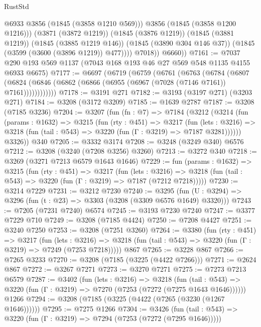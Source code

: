 \begin{lexlean}{RustStd}
\begin{coremodule}
                    @6933
                    @3856
                    (@1845 (@3858 @1210 @569)))
                  @3856
                  (@1845 (@3858 @1200 @1216)))
                (@3871 (@3872 @1219))
                (@1845 (@3876 @1219))
                (@1845 (@3881 @1219))
                (@1845 (@3885 @1219 @146))
                (@1845 (@3890 @304 @146 @37))
                (@1845 (@3599 (@3600 (@3896 @1219)) @477))))
            @7018))
        @6660))
@7161 := @7037 @290 @193 @569 @1137 (@7043 @168 @193 @46 @27 @569 @548 @1135 @4155 @6933 @6675)
@7177 := @6697
    (@6719
      (@6759
        (@6761
          (@6763
            (@6784
              (@6807
                (@6824 (@6846 (@6862 (@6866 (@6955 (@6967 (@7028 (@7146 @7161)) @7161))))))))))))
@7178 := @3191 @271
@7182 := @3193 (@3197 @271) (@3203 @271)
@7184 := @3208 (@3172 @3209)
@7185 := @1639 @2787
@7187 := @3208 (@7185 @3236)
@7204 := @3207
    (fun (fn : @7) =>
    @7184
      (@3212
        (@3214
          (fun (params : @1632) =>
          @3215
            (fun (rty : @451) =>
            @3217
              (fun (lets : @3216) =>
              @3218 (fun (tail : @543) => @3220 (fun (Γ : @3219) => @7187 @3281))))))
        @3326))
    @340
@7205 := @3332 @3174
@7208 := @3248 (@3249 @340) @6576
@7212 := @3208 (@3240 (@7208 @3256) @3260)
@7213 := @3272 @340
@7218 := @3269 (@3271 @7213 @6579 @1643 @1646)
@7229 := fun (params : @1632) =>
  @3215
    (fun (rty : @451) =>
    @3217
      (fun (lets : @3216) =>
      @3218 (fun (tail : @543) => @3220 (fun (Γ : @3219) => @7187 (@7212 @7218)))))
@7230 := @3214 @7229
@7231 := @3212 @7230
@7240 := @3295 (fun (U : @3294) => @3296 (fun (t : @23) => @3303 (@3208 (@3309 @6576 @1649) @3320)))
@7243 := @7205 (@7231 @7240) @6574
@7245 := @3193 @7230 @7240
@7247 := @3377 @7229 @710
@7249 := @3208 (@7185 @4424)
@7250 := @7208 @4427
@7251 := @3240 @7250
@7253 := @3208 (@7251 @3260)
@7264 := @3380
    (fun (rty : @451) =>
    @3217
      (fun (lets : @3216) =>
      @3218 (fun (tail : @543) => @3220 (fun (Γ : @3219) => @7249 (@7253 @7218)))))
    @867
@7265 := @3228 @867
@7266 := @7265 @3233
@7270 := @3208 (@7185 (@3225 (@4422 @7266)))
@7271 := @2624 @867
@7272 := @3267 @7271
@7273 := @3270 @7271
@7275 := @7273 @7213 @6579
@7287 := @3402
    (fun (lets : @3216) =>
    @3218
      (fun (tail : @543) => @3220 (fun (Γ : @3219) => @7270 (@7253 (@7272 (@7275 @1643 @1646))))))
    @1266
@7294 := @3208 (@7185 (@3225 (@4422 (@7265 (@3230 (@1267 @1646))))))
@7295 := @7275 @1266
@7304 := @3426
    (fun (tail : @543) => @3220 (fun (Γ : @3219) => @7294 (@7253 (@7272 (@7295 @1646)))))

\end{coremodule}
\end{lexlean}
